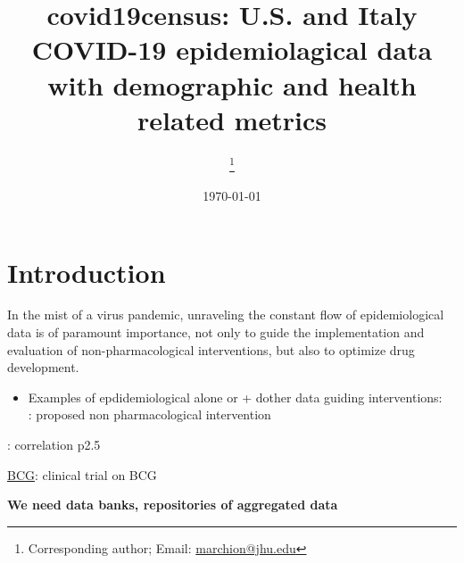 \documentclass[12pt,halfline,a4paper,]{ouparticle}
\providecommand{\tightlist}{%
  \setlength{\itemsep}{0pt}\setlength{\parskip}{0pt}}
\begin{document}
\title{covid19census: U.S. and Italy COVID-19 epidemiolagical data with
demographic and health related metrics}

\author{%
\address{Department of Oncology, Johns Hopkins University School of Medicine,
Baltimore, MD, USA}
\and
{}\address{Department of Oncology, Johns Hopkins University School of Medicine,
Baltimore, MD, USA}\thanks{Corresponding author; Email: \href{mailto:marchion@jhu.edu}{marchion@jhu.edu}}
\and
{}\address{Another University}
}


\date{\today}


\maketitle



\hypertarget{introduction}{%
\section{Introduction}\label{introduction}}

In the mist of a virus pandemic, unraveling the constant flow of
epidemiological data is of paramount importance, not only to guide the
implementation and evaluation of non-pharmacological interventions, but
also to optimize drug development.

\begin{itemize}
\tightlist
\item
  Examples of epdidemiological alone or + dother data guiding
  interventions:\\
  \citep{kissler2020s}: proposed non pharmacological intervention
\end{itemize}

\citep{wu2020m}: correlation p2.5

\href{https://www.who.int/news-room/commentaries/detail/bacille-calmette-gu\%C3\%A9rin-(bcg)-vaccination-and-covid-19}{BCG}:
clinical trial on BCG

\textbf{We need data banks, repositories of aggregated data}
\end{document}
